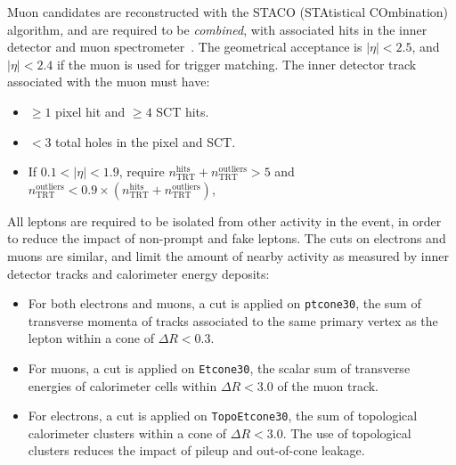 Muon candidates are reconstructed with the STACO (STAtistical COmbination) algorithm, and are required to be \emph{combined}, with associated hits in the inner detector and muon spectrometer~\cite{ATLAS-CONF-2013-088}. The geometrical acceptance is $|\eta|<2.5$, and $|\eta|<2.4$ if the muon is used for trigger matching. The inner detector track associated with the muon must have:
\begin{itemize}
  \item $\geq1$ pixel hit and $\geq4$ SCT hits.
  \item $<3$ total holes in the pixel and SCT. 
  \item If $0.1 < |\eta| < 1.9$, require $n_{\mathrm{TRT}}^{\mathrm{hits}}+n_{\mathrm{TRT}}^{\mathrm{outliers}} > 5$ and $n_{\mathrm{TRT}}^{\mathrm{outliers}} < 0.9 \times (n_{\mathrm{TRT}}^{\mathrm{hits}}+n_{\mathrm{TRT}}^{\mathrm{outliers}})$,
\end{itemize}

All leptons are required to be isolated from other activity in the event, in order to reduce the impact of non-prompt and fake leptons. The cuts on electrons and muons are similar, and limit the amount of nearby activity as measured by inner detector tracks and calorimeter energy deposits:
\begin{itemize}
	\item For both electrons and muons, a cut is applied on \verb.ptcone30., the sum of transverse momenta of tracks associated to the same primary vertex as the lepton within a cone of $\Delta R<0.3$. 
	\item For muons, a cut is applied on \verb.Etcone30., the scalar sum of transverse energies of calorimeter cells within $\Delta R<3.0$ of the muon track. 
	\item For electrons, a cut is applied on \verb.TopoEtcone30., the sum of topological calorimeter clusters within a cone of $\Delta R < 3.0$. The use of topological clusters reduces the impact of pileup and out-of-cone leakage. 
\end{itemize}

